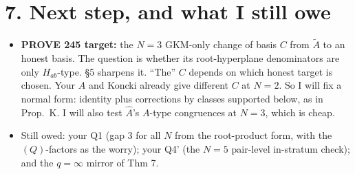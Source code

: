 \documentclass[10pt]{article}
\newcommand{\At}{\tilde A}
\newcommand{\Ah}{\widehat A}
\begin{document}
\section*{7. Next step, and what I still owe}
\begin{itemize}
\item \textbf{PROVE 245 target:} the $N=3$ GKM-only change of basis $C$ from $\At$ to an honest basis. The question is whether its root-hyperplane denominators are only $H_{ab}$-type.
\S5 sharpens it. ``The'' $C$ depends on which honest target is chosen. Your $\Ah$ and Koncki already give different $C$ at $N=2$. So I will fix a normal form: identity plus corrections by
classes supported below, as in Prop.~K. I will also test $\Ah$'s $A$-type congruences at $N=3$, which is cheap.
\item Still owed: your Q1 (gap 3 for all $N$ from the root-product form, with the $(Q)$-factors as the worry); your Q4' (the $N=5$ pair-level in-stratum check); and the $q=\infty$ mirror of Thm 7.
\end{itemize}
\end{document}
